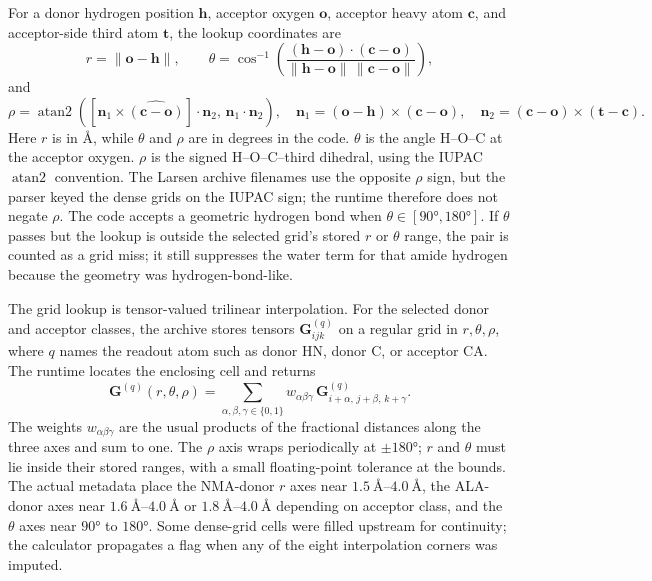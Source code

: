 \documentclass[11pt]{article}
\begin{document}
For a donor hydrogen position \(\bm h\), acceptor oxygen \(\bm o\), acceptor
heavy atom \(\bm c\), and acceptor-side third atom \(\bm t\), the lookup
coordinates are
\begin{equation}
  r = \|\bm o-\bm h\|,
  \qquad
  \theta =
  \cos^{-1}\!\left(
  \frac{(\bm h-\bm o)\cdot(\bm c-\bm o)}
       {\|\bm h-\bm o\|\,\|\bm c-\bm o\|}
  \right),
  \label{eq:rtheta}
\end{equation}
and
\begin{equation}
  \rho =
  \operatorname{atan2}\!\left(
    [\bm n_1\times\widehat{(\bm c-\bm o)}]\cdot\bm n_2,\,
    \bm n_1\cdot\bm n_2
  \right),
  \quad
  \bm n_1=(\bm o-\bm h)\times(\bm c-\bm o),\quad
  \bm n_2=(\bm c-\bm o)\times(\bm t-\bm c).
  \label{eq:rho}
\end{equation}
Here \(r\) is in \(\si{\angstrom}\), while \(\theta\) and \(\rho\) are in
degrees in the code. \(\theta\) is the angle H--O--C at the acceptor oxygen.
\(\rho\) is the signed H--O--C--third dihedral, using the IUPAC
\(\operatorname{atan2}\) convention. The Larsen archive filenames use the
opposite \(\rho\) sign, but the parser keyed the dense grids on the IUPAC sign;
the runtime therefore does not negate \(\rho\). The code accepts a geometric
hydrogen bond when \(\theta\in[\ang{90},\ang{180}]\). If \(\theta\) passes but
the lookup is outside the selected grid's stored \(r\) or \(\theta\) range, the
pair is counted as a grid miss; it still suppresses the water term for that
amide hydrogen because the geometry was hydrogen-bond-like.

The grid lookup is tensor-valued trilinear interpolation. For the selected
donor and acceptor classes, the archive stores tensors
\(\bm G_{ijk}^{(q)}\) on a regular grid in \(r,\theta,\rho\), where \(q\)
names the readout atom such as donor HN, donor C, or acceptor CA. The runtime
locates the enclosing cell and returns
\begin{equation}
  \bm G^{(q)}(r,\theta,\rho)
  =
  \sum_{\alpha,\beta,\gamma\in\{0,1\}}
  w_{\alpha\beta\gamma}\,
  \bm G^{(q)}_{i+\alpha,\,j+\beta,\,k+\gamma}.
  \label{eq:interp}
\end{equation}
The weights \(w_{\alpha\beta\gamma}\) are the usual products of the fractional
distances along the three axes and sum to one. The \(\rho\) axis wraps
periodically at \(\pm\ang{180}\); \(r\) and \(\theta\) must lie inside their
stored ranges, with a small floating-point tolerance at the bounds. The actual
metadata place the NMA-donor \(r\) axes near
\(\SIrange{1.5}{4.0}{\angstrom}\), the ALA-donor axes near
\(\SIrange{1.6}{4.0}{\angstrom}\) or
\(\SIrange{1.8}{4.0}{\angstrom}\) depending on acceptor class, and the
\(\theta\) axes near \(\ang{90}\) to \(\ang{180}\). Some dense-grid cells were
filled upstream for continuity; the calculator propagates a flag when any of
the eight interpolation corners was imputed.
\end{document}
